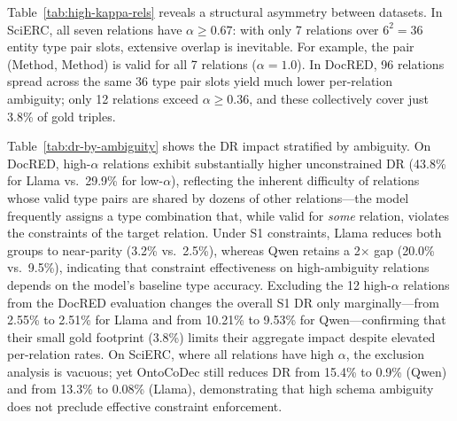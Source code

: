 \begin{table}[h]
\centering
\small
\caption{DR violation rates partitioned by schema ambiguity. High-$\alpha$ relations ($\alpha \geq 0.36$) start with substantially higher unconstrained DR on DocRED, and retain elevated residual DR under S1 for Qwen but not for Llama.}
\label{tab:dr-by-ambiguity}
\end{table}

Table~\ref{tab:high-kappa-rels} reveals a structural asymmetry between datasets.
In SciERC, all seven relations have $\alpha \geq 0.67$: with only 7 relations over $6^2 = 36$ entity type pair slots, extensive overlap is inevitable.
For example, the pair (Method, Method) is valid for all 7 relations ($\alpha = 1.0$).
In DocRED, 96 relations spread across the same 36 type pair slots yield much lower per-relation ambiguity; only 12 relations exceed $\alpha \geq 0.36$, and these collectively cover just 3.8\% of gold triples.

Table~\ref{tab:dr-by-ambiguity} shows the DR impact stratified by ambiguity.
On DocRED, high-$\alpha$ relations exhibit substantially higher unconstrained DR (43.8\% for Llama vs.\ 29.9\% for low-$\alpha$), reflecting the inherent difficulty of relations whose valid type pairs are shared by dozens of other relations---the model frequently assigns a type combination that, while valid for \emph{some} relation, violates the constraints of the target relation.
Under S1 constraints, Llama reduces both groups to near-parity (3.2\% vs.\ 2.5\%), whereas Qwen retains a 2$\times$ gap (20.0\% vs.\ 9.5\%), indicating that constraint effectiveness on high-ambiguity relations depends on the model's baseline type accuracy.
Excluding the 12 high-$\alpha$ relations from the DocRED evaluation changes the overall S1 DR only marginally---from 2.55\% to 2.51\% for Llama and from 10.21\% to 9.53\% for Qwen---confirming that their small gold footprint (3.8\%) limits their aggregate impact despite elevated per-relation rates.
On SciERC, where all relations have high $\alpha$, the exclusion analysis is vacuous; yet OntoCoDec still reduces DR from 15.4\% to 0.9\% (Qwen) and from 13.3\% to 0.08\% (Llama), demonstrating that high schema ambiguity does not preclude effective constraint enforcement.
